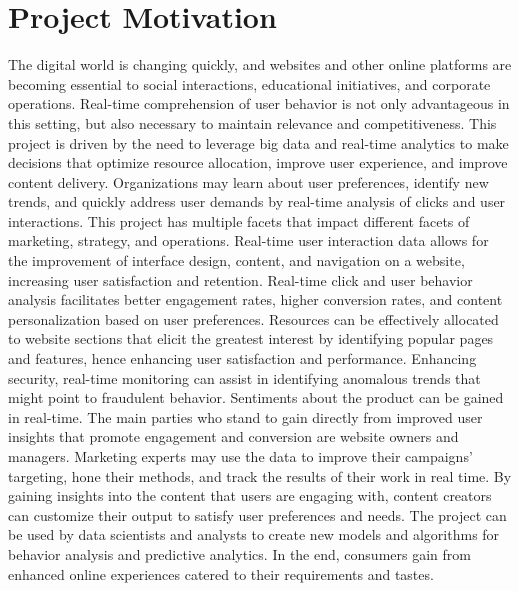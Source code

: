 \documentclass[conference]{IEEEtran}
\begin{document}
\section{Project Motivation}
The digital world is changing quickly, and websites and other online platforms are
becoming essential to social interactions, educational initiatives, and corporate operations.
Real-time comprehension of user behavior is not only advantageous in this setting, but also
necessary to maintain relevance and competitiveness. This project is driven by the need to
leverage big data and real-time analytics to make decisions that optimize resource allocation,
improve user experience, and improve content delivery. Organizations may learn about user
preferences, identify new trends, and quickly address user demands by real-time analysis of
clicks and user interactions. This project has multiple facets that impact different facets of
marketing, strategy, and operations. Real-time user interaction data allows for the improvement
of interface design, content, and navigation on a website, increasing user satisfaction and
retention. Real-time click and user behavior analysis facilitates better engagement rates, higher
conversion rates, and content personalization based on user preferences. Resources can be
effectively allocated to website sections that elicit the greatest interest by identifying popular
pages and features, hence enhancing user satisfaction and performance. Enhancing security,
real-time monitoring can assist in identifying anomalous trends that might point to fraudulent
behavior. Sentiments about the product can be gained in real-time. The main parties who stand to gain directly from improved user insights that promote
engagement and conversion are website owners and managers. Marketing experts may use the
data to improve their campaigns' targeting, hone their methods, and track the results of their
work in real time. By gaining insights into the content that users are engaging with, content
creators can customize their output to satisfy user preferences and needs. The project can be used
by data scientists and analysts to create new models and algorithms for behavior analysis and
predictive analytics. In the end, consumers gain from enhanced online experiences catered to
their requirements and tastes.
\end{document}
